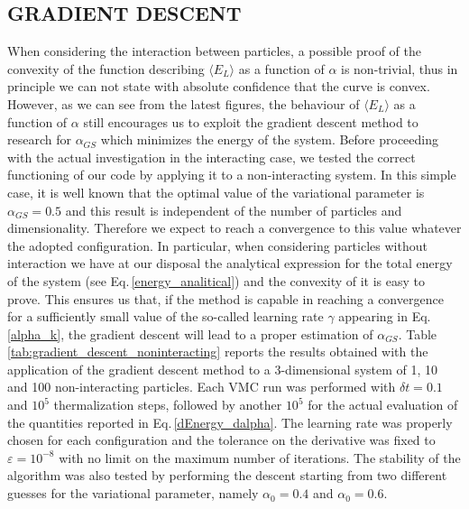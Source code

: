 \subsection{GRADIENT DESCENT}
\label{sec:gradient_descent_results}
When considering the interaction between particles, a possible proof of the convexity of the function describing $\langle E_L \rangle$ as a function of $\alpha$ is non-trivial, thus in principle we can not state with absolute confidence that the curve is convex. However, as we can see from the latest figures, the behaviour of $\langle E_L \rangle$ as a function of $\alpha$ still encourages us to exploit the gradient descent method to research for  $\alpha_{GS}$ which minimizes the energy of the system. Before proceeding with the actual investigation in the interacting case, we tested the correct functioning of our code by applying it to a non-interacting system. In this simple case, it is well known that the optimal value of the variational parameter is $\alpha_{GS}=0.5$ and this result is independent of the number of particles and dimensionality. Therefore we expect to reach a convergence to this value whatever the adopted configuration. In particular, when considering particles without interaction we have at our disposal the analytical expression for the total energy of the system (see Eq.\,\ref{energy_analitical}) and the convexity of it is easy to prove. This ensures us that, if the method is capable in reaching a convergence for a sufficiently small value of the so-called learning rate $\gamma$ appearing in Eq.\,\ref{alpha_k}, the gradient descent will lead to a proper estimation of $\alpha_{GS}$. Table \ref{tab:gradient_descent_noninteracting} reports the results obtained with the application of the gradient descent method to a 3-dimensional system of 1, 10 and 100 non-interacting particles. Each VMC run was performed with $\delta t=0.1$ and $10^5$ thermalization steps, followed by another $10^5$ for the actual evaluation of the quantities reported in Eq.\,\ref{dEnergy_dalpha}. The learning rate was properly chosen for each configuration and the tolerance on the derivative was fixed to $\varepsilon=10^{-8}$ with no limit on the maximum number of iterations. The stability of the algorithm was also tested by performing the descent starting from two different guesses for the variational parameter, namely $\alpha_0=0.4$ and $\alpha_0=0.6$.

